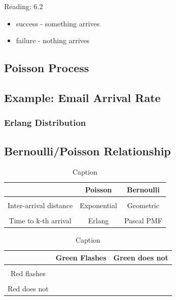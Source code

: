 \documentclass{article}
\begin{document}

Reading: 6.2

\begin{itemize}
    \item success - something arrives
    \item failure - nothing arrives
\end{itemize}

\subsection{Poisson Process}


\subsection{Example: Email Arrival Rate}


\subsubsection{Erlang Distribution}


\subsection{Bernoulli/Poisson Relationship}


\begin{table}[ht]
    \centering
    \begin{tabular}{c|c|c}
           & Poisson & Bernoulli \\
           \hline \\
         Inter-arrival distance & Exponential & Geometric  \\
         \hline \\
         Time to k-th arrival & Erlang & Pascal PMF 
    \end{tabular}
    \caption{Caption}
    \label{tab:Poisson_Bernoulli_label}
\end{table}


\begin{table}[]
    \centering
    \begin{tabular}{c|c| c}
         & Green Flashes & Green does not \\
         \hline \\
         Red flashes&  &\\
         \hline \\
         Red does not & & 
    \end{tabular}
    \caption{Caption}
    \label{tab:red_flashes_label}
\end{table}
\end{document}
